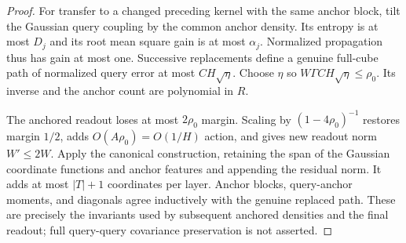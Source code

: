\documentclass[11pt]{article}
\theoremstyle{remark}
\begin{document}
\begin{proof}
For transfer to a changed preceding kernel with the same anchor
block, tilt the Gaussian query coupling by the common anchor
density. Its entropy is at most $D_j$ and its root mean square
gain is at most $\alpha_j$. Normalized propagation thus has
gain at most one. Successive replacements define a genuine
full-cube path of normalized query error at most $CH\sqrt\eta$.
Choose $\eta$ so $W\Gamma CH\sqrt\eta\le\rho_0$.
Its inverse and the anchor count are polynomial in $R$.

The anchored readout loses at most $2\rho_0$ margin. Scaling by
$(1-4\rho_0)^{-1}$ restores margin $1/2$, adds
$O(A\rho_0)=O(1/H)$ action, and gives new readout norm
$W'\le2W$. Apply the canonical construction, retaining the span
of the Gaussian coordinate functions and anchor features and
appending the residual norm. It adds at most $|T|+1$ coordinates
per layer. Anchor blocks, query-anchor moments, and diagonals
agree inductively with the genuine replaced path. These are
precisely the invariants used by subsequent anchored densities
and the final readout; full query-query covariance preservation
is not asserted.
\end{proof}
\end{document}

